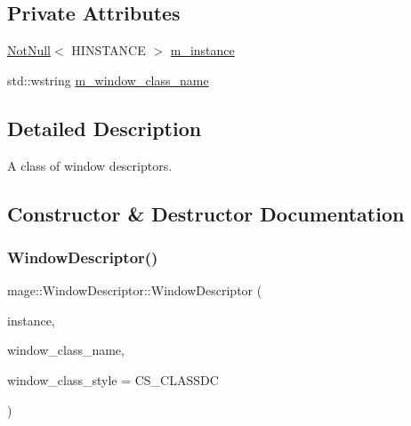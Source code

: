 \subsection*{Private Attributes}
\begin{DoxyCompactItemize}
\item 
\mbox{\hyperlink{namespacemage_a8769f9d670d6b585ea306cb1062af94b}{Not\+Null}}$<$ H\+I\+N\+S\+T\+A\+N\+CE $>$ \mbox{\hyperlink{classmage_1_1_window_descriptor_afa7ab62493d51db5d1ab6a4167f2da4a}{m\+\_\+instance}}
\item 
std\+::wstring \mbox{\hyperlink{classmage_1_1_window_descriptor_a773ae3d93c90d65690f18d79945530ed}{m\+\_\+window\+\_\+class\+\_\+name}}
\end{DoxyCompactItemize}


\subsection{Detailed Description}
A class of window descriptors. 

\subsection{Constructor \& Destructor Documentation}
\mbox{\label{classmage_1_1_window_descriptor_a3c0f82aaea1ac634e0001e2bdf1484ab}} 
\subsubsection{\texorpdfstring{Window\+Descriptor()}{WindowDescriptor()}\hspace{0.1cm}{\footnotesize\ttfamily [1/3]}}
{\footnotesize\ttfamily mage\+::\+Window\+Descriptor\+::\+Window\+Descriptor (\begin{DoxyParamCaption}\item[{\mbox{\hyperlink{namespacemage_a8769f9d670d6b585ea306cb1062af94b}{Not\+Null}}$<$ H\+I\+N\+S\+T\+A\+N\+CE $>$}]{instance,  }\item[{std\+::wstring}]{window\+\_\+class\+\_\+name,  }\item[{\mbox{\hyperlink{namespacemage_a41c104c036fba3756a74e19f793eeaa1}{U32}}}]{window\+\_\+class\+\_\+style = {\ttfamily CS\+\_\+CLASSDC} }\end{DoxyParamCaption})\hspace{0.3cm}{\ttfamily [explicit]}}

